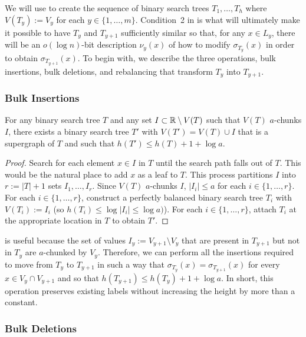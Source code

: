 \documentclass[kpfonts]{patmorin}
\begin{document}
We will use  to create the sequence of binary search trees $T_1,\ldots,T_h$ where $V(T_y):=V_y$ for each $y\in\{1,\ldots,m\}$.  Condition~2 in  is what will ultimately make it possible to have $T_y$ and $T_{y+1}$ sufficiently similar so that, for any $x\in L_y$, there will be an $o(\log n)$-bit description $\nu_y(x)$ of how to modify $\sigma_{T_y}(x)$ in order to obtain $\sigma_{T_{y+1}}(x)$.  To begin with, we describe the three operations, bulk insertions, bulk deletions, and rebalancing that transform $T_y$ into $T_{y+1}$.  

\subsubsection{Bulk Insertions}

\begin{lem}
  For any binary search tree $T$ and any set $I\subset\mathbb{R}\setminus V(T)$ such that $V(T)$ $a$-chunks $I$, there exists a binary search tree $T'$ with $V(T')=V(T)\cup I$ that is a supergraph of $T$ and such that $h(T')\le h(T)+1+\log a$.
\end{lem}

\begin{proof}
  Search for each element $x\in I$ in $T$ until the search path falls out of $T$.  This would be the natural place to add $x$ as a leaf to $T$.  This process partitions $I$ into $r:=|T|+1$ sets $I_1,\ldots,I_r$. Since $V(T)$ $a$-chunks $I$, $|I_i|\le a$ for each $i\in\{1,\ldots,r\}$. For each $i\in\{1,\ldots,r\}$, construct a perfectly balanced binary search tree $T_i$ with $V(T_i):=I_i$ (so $h(T_i)\le\log|I_i|\le\log a)$). For each $i\in\{1,\ldots,r\}$, attach $T_i$ at the appropriate location in $T$ to obtain $T'$.
\end{proof}

 is useful because the set of values $I_y:=V_{y+1}\setminus V_y$ that are present in $T_{y+1}$ but not in $T_y$ are $a$-chunked by $V_y$. Therefore, we can perform all the insertions required to move from $T_y$ to $T_{y+1}$ in such a way that $\sigma_{T_y}(x)=\sigma_{T_{y+1}}(x)$ for every $x\in V_y\cap V_{y+1}$ and so that $h(T_{y+1})\le h(T_y)+1+\log a$.  In short, this operation preserves existing labels without increasing the height by more than a constant.

\subsubsection{Bulk Deletions}
\end{document}
